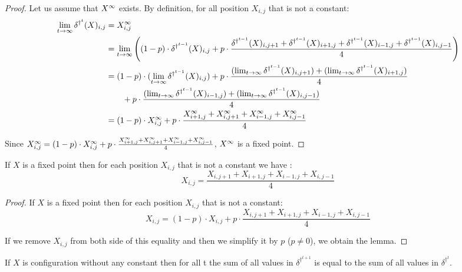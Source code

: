 \begin{proof}
  Let us assume that $X^{\infty}$ exists. By definition, for all position $X_{i,j}$ that is not a constant:
   \[\begin{split}
      \lim_{t \rightarrow \infty} \delta^{\dag^t}(X)_{i,j} & = X^{\infty}_{i,j} \\
        & = \lim_{t \rightarrow \infty} \left( (1-p) \cdot \delta^{\dag^{t-1}}(X)_{i,j} + p \cdot \frac{\delta^{\dag^{t-1}}(X)_{i,j+1} + \delta^{\dag^{t-1}}(X)_{i+1,j} + \delta^{\dag^{t-1}}(X)_{i-1,j} + \delta^{\dag^{t-1}}(X)_{i,j-1}}{4} \right) \\
        & = (1-p) \cdot (\lim_{t \rightarrow \infty} \delta^{\dag^{t-1}}(X)_{i,j}) + p \cdot \frac{(\lim_{t \rightarrow \infty} \delta^{\dag^{t-1}}(X)_{i,j+1}) + (\lim_{t \rightarrow \infty} \delta^{\dag^{t-1}}(X)_{i+1,j})}{4}\\
        & \qquad + p \cdot \frac{(\lim_{t \rightarrow \infty} \delta^{\dag^{t-1}}(X)_{i-1,j}) + (\lim_{t \rightarrow \infty} \delta^{\dag^{t-1}}(X)_{i,j-1})}{4} \\
        & = (1-p) \cdot X^{\infty}_{i,j} + p \cdot \frac{X^{\infty}_{i+1,j} + X^{\infty}_{i,j+1} + X^{\infty}_{i-1,j} + X^{\infty}_{i,j-1}}{4}
 \end{split}\] 

Since $X^{\infty}_{i,j} = (1-p) \cdot X^{\infty}_{i,j} + p \cdot \frac{X^{\infty}_{i+1,j} + X^{\infty}_{i,j+1} + X^{\infty}_{i-1,j} + X^{\infty}_{i,j-1}}{4}$, $X^{\infty}$ is a fixed point.

\end{proof}

\begin{lemma}
 \label{aver}
 If $X$ is a fixed point then for each position $X_{i,j}$ that is not a constant we have : 
\[ X_{i,j} = \frac{X_{i,j+1} + X_{i+1,j} + X_{i-1,j} + X_{i,j-1}}{4} \]
\end{lemma}

\begin{proof}
  If $X$ is a fixed point then for each position $X_{i,j}$ that is not a constant:
  \[ X_{i,j} = (1-p) \cdot X_{i,j} + p \cdot \frac{X_{i,j+1} + X_{i+1,j} + X_{i-1,j} + X_{i,j-1}}{4} \]
  
  If we remove $X_{i,j}$ from both side of this equality and then we simplify it by $p$ ($p \neq 0$), we obtain the lemma.
\end{proof}


\begin{lemma}
  \label{conservative}
  If $X$ is configuration without any constant then for all t the sum of all values in $\delta^{\dag^{t+1}}$ is equal to the sum of all values in $\delta^{\dag^t}$.
\end{lemma}

